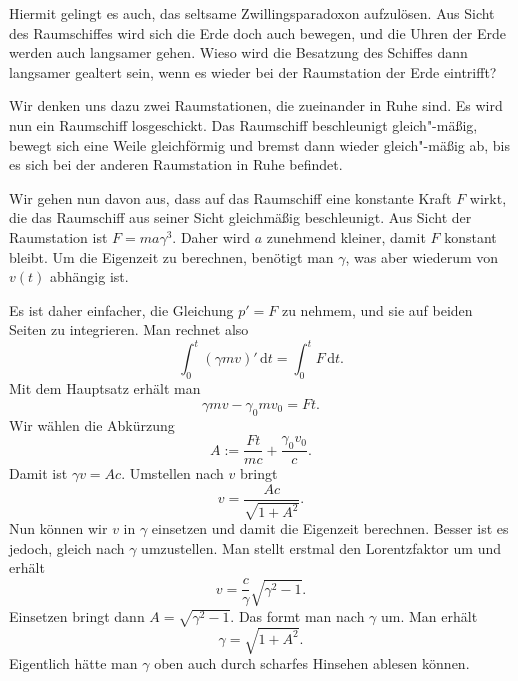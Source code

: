\documentclass[a4paper,11pt,fleqn,twocolumn,twoside,dvipdfmx]{scrartcl}
\begin{document}
Hiermit gelingt es auch, das seltsame Zwillingsparadoxon aufzulösen.
Aus Sicht des Raumschiffes wird sich die Erde doch auch bewegen, und
die Uhren der Erde werden auch langsamer gehen. Wieso wird die
Besatzung des Schiffes dann langsamer gealtert sein, wenn es wieder
bei der Raumstation der Erde eintrifft?

Wir denken uns dazu zwei Raumstationen, die zueinander in Ruhe sind.
Es wird nun ein Raumschiff losgeschickt. Das Raumschiff beschleunigt
gleich"-mäßig, bewegt sich eine Weile gleichförmig und bremst dann
wieder gleich"-mäßig ab, bis es sich bei der anderen Raumstation
in Ruhe befindet.

Wir gehen nun davon aus, dass auf das Raumschiff eine konstante
Kraft $F$ wirkt, die das Raumschiff aus seiner Sicht gleichmäßig
beschleunigt. Aus Sicht der Raumstation ist $F=ma\gamma^3$. Daher
wird $a$ zunehmend kleiner, damit $F$ konstant bleibt. Um die
Eigenzeit zu berechnen, benötigt man $\gamma$, was aber wiederum
von $v(t)$ abhängig ist.

Es ist daher einfacher, die Gleichung $p'=F$ zu nehmem, und sie auf
beiden Seiten zu integrieren. Man rechnet also%
\[\int_0^t (\gamma mv)'\,\mathrm dt = \int_0^t F\,\mathrm dt.\]
Mit dem Hauptsatz erhält man%
\[\gamma mv-\gamma_0mv_0 = Ft.\]
Wir wählen die Abkürzung%
\[A:=\frac{Ft}{mc}+\frac{\gamma_0v_0}{c}.\]
Damit ist $\gamma v = Ac$. Umstellen nach $v$ bringt%
\[v = \frac{Ac}{\sqrt{1+A^2}}.\]
Nun können wir $v$ in $\gamma$ einsetzen und damit die Eigenzeit
berechnen. Besser ist es jedoch, gleich nach $\gamma$ umzustellen.
Man stellt erstmal den Lorentzfaktor um und erhält%
\[v = \frac{c}{\gamma}\sqrt{\gamma^2-1}.\]
Einsetzen bringt dann $A=\sqrt{\gamma^2-1}$. Das formt man nach
$\gamma$ um. Man erhält%
\[\gamma=\sqrt{1+A^2}.\]
Eigentlich hätte man $\gamma$ oben auch durch scharfes Hinsehen
ablesen können.
\end{document}
